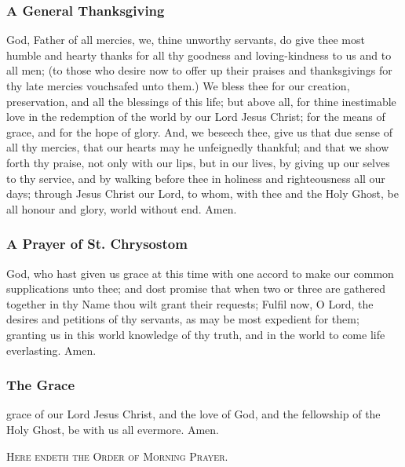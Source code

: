 \subsubsection{A General Thanksgiving}
 God, Father of all mercies, we, thine unworthy servants, do give thee most humble and hearty thanks for all thy goodness and loving-kindness to us and to all men; (to those who desire now to offer up their praises and thanksgivings for thy late mercies vouchsafed unto them.) We bless thee for our creation, preservation, and all the blessings of this life; but above all, for thine inestimable love in the redemption of the world by our Lord Jesus Christ; for the means of grace, and for the hope of glory. And, we beseech thee, give us that due sense of all thy mercies, that our hearts may he unfeignedly thankful; and that we show forth thy praise, not only with our lips, but in our lives, by giving up our selves to thy service, and by walking before thee in holiness and righteousness all our days; through Jesus Christ our Lord, to whom, with thee and the Holy Ghost, be all honour and glory, world without end. Amen.
\subsubsection{A Prayer of St. Chrysostom}
 God, who hast given us grace at this time with one accord to make our common supplications unto thee; and dost promise that when two or three are gathered together in thy Name thou wilt grant their requests; Fulfil now, O Lord, the desires and petitions of thy servants, as may be most expedient for them; granting us in this world knowledge of thy truth, and in the world to come life everlasting. Amen.
\subsubsection{The Grace}
 grace of our Lord Jesus Christ, {} and the love of God, and the fellowship of the Holy Ghost, be with us all evermore. Amen.\par
\begin{center}
	\textsc{Here endeth the Order of Morning Prayer.}
\end{center}